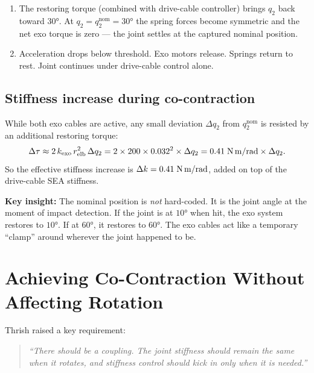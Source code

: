 \documentclass[11pt, a4paper]{article}
\begin{document}
\begin{enumerate}
    \item[\textbf{T$_4$}:]
        The restoring torque (combined with drive-cable controller) brings
        $q_2$ back toward $30°$.  At $q_2 = q_2^{\text{nom}} = 30°$ the
        spring forces become symmetric and the net exo torque is zero ---
        the joint settles at the captured nominal position.

    \item[\textbf{T$_5$}:]
        Acceleration drops below threshold.  Exo motors release.  Springs
        return to rest.  Joint continues under drive-cable control alone.
\end{enumerate}

\subsection*{Stiffness increase during co-contraction}

While both exo cables are active, any small deviation $\Delta q_2$ from
$q_2^{\text{nom}}$ is resisted by an additional restoring torque:
\[
    \Delta\tau \approx 2\,k_{\text{exo}}\,r_{\text{elb}}^2\,\Delta q_2
    = 2 \times 200 \times 0.032^2 \times \Delta q_2
    = 0.41\;\text{N\,m/rad} \times \Delta q_2.
\]
So the effective stiffness increase is $\Delta k = 0.41\;\text{N\,m/rad}$,
added on top of the drive-cable SEA stiffness.

\begin{mdframed}
\textbf{Key insight:} The nominal position is \emph{not} hard-coded.
It is the joint angle at the moment of impact detection.  If the joint is
at $10°$ when hit, the exo system restores to $10°$.  If at $60°$, it
restores to $60°$.  The exo cables act like a temporary ``clamp'' around
wherever the joint happened to be.
\end{mdframed}

\section{Achieving Co-Contraction Without Affecting Rotation}
\label{sec:coupling}

Thrish raised a key requirement:

\begin{quote}
\emph{``There should be a coupling.  The joint stiffness should remain the
same when it rotates, and stiffness control should kick in only when it is
needed.''}
\end{quote}
\end{document}
